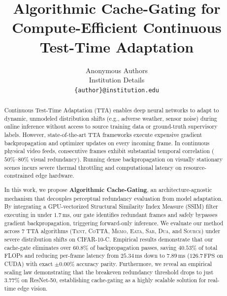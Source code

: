 \documentclass[10pt,twocolumn,letterpaper]{article}
\begin{document}
\title{Algorithmic Cache-Gating for Compute-Efficient Continuous Test-Time Adaptation}

\author{
Anonymous Authors\\
Institution Details\\
{\tt\small \{author\}@institution.edu}
}

\maketitle

\begin{abstract}
Continuous Test-Time Adaptation (TTA) enables deep neural networks to adapt to dynamic, unmodeled distribution shifts (e.g., adverse weather, sensor noise) during online inference without access to source training data or ground-truth supervisory labels. However, state-of-the-art TTA frameworks execute expensive gradient backpropagation and optimizer updates on every incoming frame. In continuous physical video feeds, consecutive frames exhibit substantial temporal correlation ($50\%\text{--}80\%$ visual redundancy). Running dense backpropagation on visually stationary scenes incurs severe thermal throttling and computational latency on resource-constrained edge hardware. 

In this work, we propose \textbf{Algorithmic Cache-Gating}, an architecture-agnostic mechanism that decouples perceptual redundancy evaluation from model adaptation. By integrating a GPU-vectorized Structural Similarity Index Measure (SSIM) filter executing in under $1.7\,\text{ms}$, our gate identifies redundant frames and safely bypasses gradient backpropagation, triggering forward-only inference. We evaluate our method across 7 TTA algorithms (\textsc{Tent}, \textsc{CoTTA}, \textsc{Memo}, \textsc{Eata}, \textsc{Sar}, \textsc{Dua}, and \textsc{Source}) under severe distribution shifts on CIFAR-10-C. Empirical results demonstrate that our cache-gate eliminates over $60.8\%$ of backpropagation passes, saving $40.53\%$ of total FLOPs and reducing per-frame latency from $25.34\,\text{ms}$ down to $7.89\,\text{ms}$ ($126.7\,\text{FPS}$ on CUDA) with exact $\pm 0.00\%$ accuracy parity. Furthermore, we reveal an empirical scaling law demonstrating that the breakeven redundancy threshold drops to just $3.77\%$ on ResNet-50, establishing cache-gating as a highly scalable solution for real-time edge vision.
\end{abstract}
\end{document}
